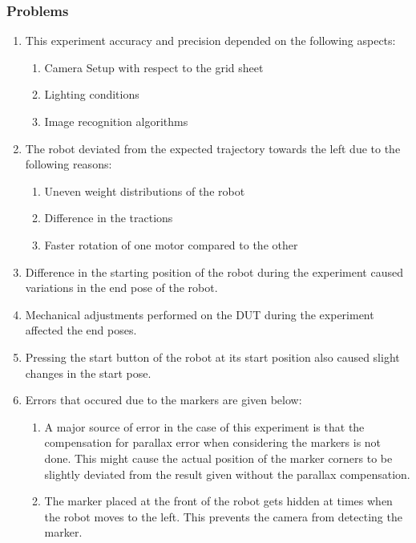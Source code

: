\subsubsection{Problems}

\begin{enumerate}
	\item
	This experiment accuracy and precision depended on the following aspects:
	\begin{enumerate}
		\item
		Camera Setup with respect to the grid sheet
		\item
		Lighting conditions
		\item
		Image recognition algorithms
	\end{enumerate}	 
	\item
	The robot deviated from the expected trajectory towards the left due to the following reasons:
	\begin{enumerate}
		\item
		Uneven weight distributions of the robot
		\item
		Difference in the tractions
		\item
		Faster rotation of one motor compared to the other
	\end{enumerate}
	\item
	Difference in the starting position of the robot during the experiment caused variations in the end pose of the robot.
	\item
	Mechanical adjustments performed on the DUT during the experiment affected the end poses.
	\item
	Pressing the start button of the robot at its start position also caused slight changes in the start pose.
	\item
	Errors that occured due to the markers are given below:
	\begin{enumerate}
		\item
		A major source of error in the case of this experiment is that the compensation for parallax error when considering the markers is not done. This might cause the actual position of the marker corners to be slightly deviated from the result given without the parallax compensation.
		
		\item
		The marker placed at the front of the robot gets hidden at times when the robot moves to the left. This prevents the camera from detecting the marker.
		
		\vspace{0.5cm}
		

\end{enumerate}
\end{enumerate}
